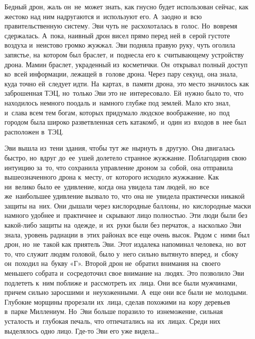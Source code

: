 Бедный дрон, жаль он~не~может знать, как гнусно будет использован сейчас, как жестоко над ним надругаются и~используют его.
А~заодно и~всю правительственную систему.
Эви чуть не~расхохоталась в~голос.
Но~вовремя сдержалась.
А~пока, наивный дрон висел прямо перед ней в~серой густоте воздуха и~неистово громко жужжал.
Эви подняла правую руку, чуть оголила запястье, на~котором был браслет, и~поднесла его к~считывающему устройству дрона.
Мамин браслет, украденный из~косметички.
Он~открывал полный доступ ко~всей информации, лежащей в~голове дрона.
Через пару секунд, она знала, куда точно ей~следует идти.
На~картах, в~памяти дрона, это место значилось как заброшенная ТЭЦ, но~только Эви это не~интересовало.
Ей~нужно было то, что находилось немного поодаль и~намного глубже под землей.
Мало кто знал, и~слава всем тем богам, которых придумало людское воображение, но~под городом была широко разветвленная сеть катакомб, и~один из~входов в~нее был расположен в~ТЭЦ.

Эви вышла из~тени здания, чтобы тут же~нырнуть в~другую.
Она двигалась быстро, но~вдруг до~ее~ушей долетело странное жужжание.
Поблагодарив свою интуицию за~то, что сохранила управление дроном за~собой, она отправила вышеозначенного дрона к~месту, от~которого исходило жужжание.
Как ни~велико было ее~удивление, когда она увидела там людей, но~все же~наибольшее удивление вызвало то, что она не~увидела практически никакой защиты на~них.
Они дышали через кислородные баллоны, но~кислородные маски намного удобнее и~практичнее и~скрывают лицо полностью.
Эти люди были без какой-либо защиты на~одежде, и~их~руки были без перчаток, а~насколько Эви знала, уровень радиации в~этих районах все еще очень высок.
Рядом с~ними был дрон, но~не~такой как приятель Эви.
Этот издалека напоминал человека, но~вот то, что служит людям головой, было у~него сильно вытянуто вперед, и~сбоку он~походил на~букву «Г».
Второй дрон не~обратил внимания на~своего меньшего собрата и~сосредоточил свое внимание на~людях.
Это позволило Эви подлететь к~ним поближе и~рассмотреть их~лица.
Они все были мужчинами, причем сильно заросшими и~неухоженными.
А~еще они все были не~молодыми.
Глубокие морщины прорезали их~лица, сделав похожими на~кору деревьев в~парке Миллениум.
Но~Эви больше поразило то~изнеможение, сильная усталость и~глубокая печаль, что отпечатались на~их~лицах.
Среди них выделялось одно лицо.
Где-то Эви его уже видела…
 
